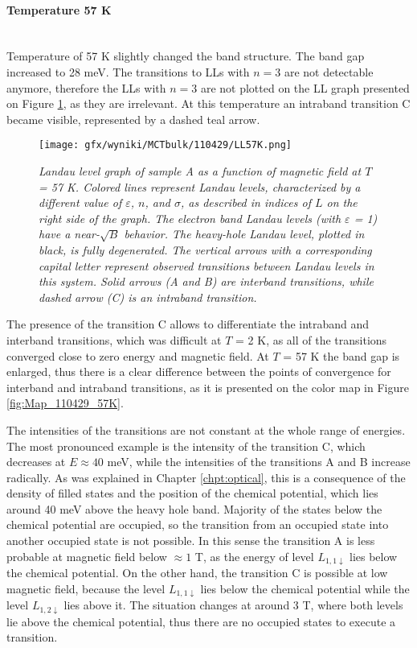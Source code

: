 \documentclass[titlepage,a4paper]{book}
\newcommand{\wciecie}{\quad\phantom{v}}
\newcommand{\myparagraph}[1]{\paragraph{#1}\mbox{}\\}
\begin{document}
\myparagraph{Temperature 57 K}
\wciecie
Temperature of 57 K slightly changed the band structure. The band gap increased to 28 meV. The transitions to LLs with $n = 3$ are not detectable anymore, therefore the LLs with $n = 3$ are not plotted on the LL graph presented on Figure \ref{fig:LL_110429_57K}, as they are irrelevant. At this temperature an intraband transition C became visible, represented by a dashed teal arrow.

\begin{figure}[ht]
	\centering
	\texttt{[image: gfx/wyniki/MCTbulk/110429/LL57K.png]}
	\vspace{-10pt}
	\caption{\textit{Landau level graph of sample A as a function of magnetic field at $T$ = 57 K. Colored lines represent Landau levels, characterized by a different value of $\varepsilon$, $n$, and $\sigma$, as described in indices of $L$ on the right side of the graph. The electron band Landau levels (with $\varepsilon$ = 1) have a near-$\sqrt{B}$ behavior. The heavy-hole Landau level, plotted in black, is fully degenerated. The vertical arrows with a corresponding capital letter represent observed transitions between Landau levels in this system. Solid arrows (A and B) are interband transitions, while dashed arrow (C) is an intraband transition.}} 
	\label{fig:LL_110429_57K}
\end{figure}

The presence of the transition C allows to differentiate the intraband and interband transitions, which was difficult at $T$ = 2 K, as all of the transitions converged close to zero energy and magnetic field. At $T$ = 57 K the band gap is enlarged, thus there is a clear difference between the points of convergence for interband and intraband transitions, as it is presented on the color map in Figure \ref{fig:Map_110429_57K}.
 
The intensities of the transitions are not constant at the whole range of energies. The most pronounced example is the intensity of the transition C, which decreases at $E \approx 40$ meV, while the intensities of the transitions A and B increase radically. As was explained in Chapter \ref{chpt:optical}, this is a consequence of the density of filled states and the position of the chemical potential, which lies around 40 meV above the heavy hole band. Majority of the states below the chemical potential are occupied, so the transition from an occupied state into another occupied state is not possible. In this sense the transition A is less probable at magnetic field below $\approx 1$ T, as the energy of level $L_{1,1\downarrow}$ lies below the chemical potential. On the other hand, the transition C is possible at low magnetic field, because the level $L_{1,1\downarrow}$ lies below the chemical potential while the level $L_{1,2\downarrow}$ lies above it. The situation changes at around 3 T, where both levels lie above the chemical potential, thus there are no occupied states to execute a transition. 
 
\end{document}
